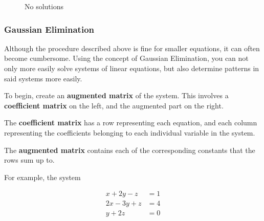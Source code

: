 \documentclass[12pt]{article}
\begin{document}
\begin{figure}[!ht]%
    \centering
    \qquad
    \caption{No solutions}
    \label{fig:nosolutions}%
\end{figure}

\subsubsection{Gaussian Elimination}
Although the procedure described above is fine for smaller equations, it can often become cumbersome. Using the concept of Gaussian Elimination, you can not only more easily solve systems of linear equations, but also determine patterns in said systems more easily.

To begin, create an \textbf{augmented matrix} of the system. This involves a \textbf{coefficient matrix} on the left, and the augmented part on the right.

The \textbf{coefficient matrix} has a row representing each equation, and each column representing the coefficients belonging to each individual variable in the system.

The \textbf{augmented matrix} contains each of the corresponding constants that the rows sum up to.

For example, the system

\begin{equation}
\begin{split}
    x + 2y - z &= 1\\    
    2x -3y + z &= 4\\
    y + 2z &= 0\\
\end{split}
\end{equation}
\end{document}
